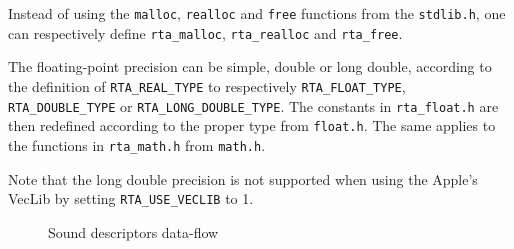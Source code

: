 \documentclass[a4paper, twoside]{article}
\begin{document}
Instead of using the \texttt{malloc}, \texttt{realloc} and
\texttt{free} functions from the \texttt{stdlib.h}, one can
respectively define \texttt{rta\_malloc}, \texttt{rta\_realloc}
and \texttt{rta\_free}.

The floating-point precision can be simple, double or long
double, according to the definition of \texttt{RTA\_REAL\_TYPE} to
respectively \texttt{RTA\_FLOAT\_TYPE}, \texttt{RTA\_DOUBLE\_TYPE} or
\texttt{RTA\_LONG\_DOUBLE\_TYPE}. The constants in
\texttt{rta\_float.h} are then redefined according to the proper type
from \texttt{float.h}. The same applies to the functions in
\texttt{rta\_math.h} from \texttt{math.h}.

Note that the long double precision is not supported when using the
Apple's VecLib by setting \texttt{RTA\_USE\_VECLIB} to 1.


\begin{figure}[!hbt]
  \centering
  \caption[Sound descriptors data-flow]{Sound descriptors data-flow}
  \label{fig:dataflow}
\end{figure}
\end{document}
